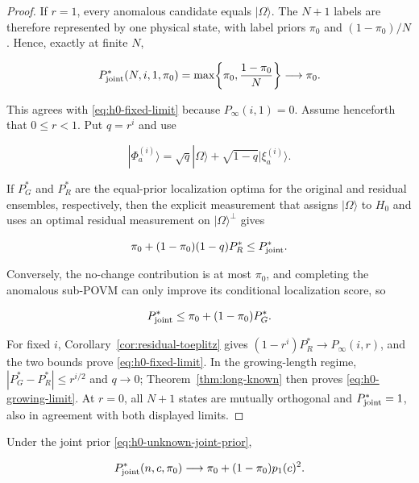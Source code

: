 \begin{proof}
If \(r=1\), every anomalous candidate equals \(|\Omega\rangle\). The \(N+1\)
labels are therefore represented by one physical state, with label priors
\(\pi_0\) and \((1-\pi_0)/N\). Hence, exactly at finite \(N\),

\begin{equation}\label{eq:h0-fixed-r-one}
P_{\rm joint}^*(N,i,1,\pi_0)
=\max\!\left\{\pi_0,\frac{1-\pi_0}{N}\right\}
\longrightarrow\pi_0.
\end{equation}

This agrees with \eqref{eq:h0-fixed-limit} because
\(P_\infty(i,1)=0\). Assume henceforth that \(0\le r<1\).
Put \(q=r^i\) and use

\[
|\Phi_a^{(i)}\rangle
=\sqrt q|\Omega\rangle+\sqrt{1-q}|\xi_a^{(i)}\rangle.
\]

If \(P_G^*\) and \(P_R^*\) are the equal-prior localization optima for the original and residual ensembles, respectively, then the explicit measurement that assigns \(|\Omega\rangle\) to \(H_0\) and uses an optimal residual measurement on \(|\Omega\rangle^\perp\) gives

\[
\pi_0+(1-\pi_0)(1-q)P_R^*
\le P_{\rm joint}^*.
\]

Conversely, the no-change contribution is at most \(\pi_0\), and completing the anomalous sub-POVM can only improve its conditional localization score, so

\[
P_{\rm joint}^*\le\pi_0+(1-\pi_0)P_G^*.
\]

For fixed \(i\), Corollary~\ref{cor:residual-toeplitz} gives
\((1-r^i)P_R^*\to P_\infty(i,r)\), and the two bounds prove
\eqref{eq:h0-fixed-limit}. In the growing-length regime,
\(|P_G^*-P_R^*|\le r^{i/2}\) and \(q\to0\); Theorem~\ref{thm:long-known}
then proves \eqref{eq:h0-growing-limit}. At \(r=0\), all \(N+1\) states are
mutually orthogonal and \(P_{\rm joint}^*=1\), also in agreement with both
displayed limits.
\end{proof}

\begin{theorem}\label{thm:h0-unknown-length}
Under the joint prior \eqref{eq:h0-unknown-joint-prior},

\begin{equation}\label{eq:h0-unknown-limit}
P_{\rm joint}^*(n,c,\pi_0)
\longrightarrow
\pi_0+(1-\pi_0)p_1(c)^2.
\end{equation}
\end{theorem}


